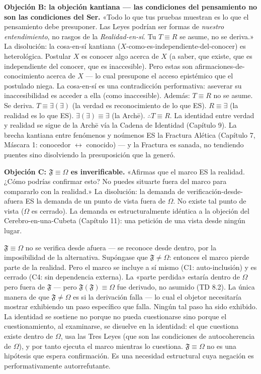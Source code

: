 \documentclass[10pt, openany, oneside]{book}
\begin{document}
\textbf{Objeción B: la objeción kantiana --- las condiciones del pensamiento no son las condiciones del Ser.} «Todo lo que tus pruebas muestran es lo que el pensamiento debe presuponer. Las Leyes podrían ser formas de \textit{nuestro entendimiento}, no rasgos de la \textit{Realidad-en-sí}. Tu $T \equiv R$ se asume, no se deriva.» La disolución: la cosa-en-sí kantiana ($X$-como-es-independiente-del-conocer) es heterológica. Postular $X$ es conocer algo acerca de $X$ (a saber, que existe, que es independiente del conocer, que es inaccesible). Pero estas son afirmaciones-de-conocimiento acerca de $X$ --- lo cual presupone el acceso epistémico que el postulado niega. La cosa-en-sí es una contradicción performativa: aseverar su inaccesibilidad es acceder a ella (como inaccesible). Además: $T \equiv R$ no se asume. Se deriva. $T \equiv \exists(\exists)$ (la verdad es reconocimiento de lo que ES). $R \equiv \exists$ (la realidad es lo que ES). $\exists(\exists) \equiv \exists$ (la Arch\={e}). $\therefore T \equiv R$. La identidad entre verdad y realidad se sigue de la Arch\={e} vía la Cadena de Identidad (Capítulo 9). La brecha kantiana entre fenómenos y noúmenos ES la Fractura Alética (Capítulo 7, Máscara 1: conocedor $\leftrightarrow$ conocido) --- y la Fractura es sanada, no tendiendo puentes sino disolviendo la presuposición que la generó.

\textbf{Objeción C: $\mathfrak{F} \equiv \Omega$ es inverificable.} «Afirmas que el marco ES la realidad. ¿Cómo podrías confirmar esto? No puedes situarte fuera del marco para compararlo con la realidad.» La disolución: la demanda de verificación-desde-afuera ES la demanda de un punto de vista fuera de $\Omega$. No existe tal punto de vista ($\Omega$ es cerrado). La demanda es estructuralmente idéntica a la objeción del Cerebro-en-una-Cubeta (Capítulo 11): una petición de una vista desde ningún lugar.

$\mathfrak{F} \equiv \Omega$ no se verifica desde afuera --- se reconoce desde dentro, por la imposibilidad de la alternativa. Supóngase que $\mathfrak{F} \neq \Omega$: entonces el marco pierde parte de la realidad. Pero el marco se incluye a sí mismo (C1: auto-inclusión) y es cerrado (C4: sin dependencia externa). La «parte perdida» estaría dentro de $\Omega$ pero fuera de $\mathfrak{F}$ --- pero $\mathfrak{F}(\mathfrak{F}) \equiv \Omega$ fue derivado, no asumido (TD 8.2). La única manera de que $\mathfrak{F} \neq \Omega$ es si la derivación falla --- lo cual el objetor necesitaría mostrar exhibiendo un paso específico que falla. Ningún tal paso ha sido exhibido. La identidad se sostiene no porque no pueda cuestionarse sino porque el cuestionamiento, al examinarse, se disuelve en la identidad: el que cuestiona existe dentro de $\Omega$, usa las Tres Leyes (que son las condiciones de autocoherencia de $\Omega$), y por tanto ejecuta el marco mientras lo cuestiona. $\mathfrak{F} \equiv \Omega$ no es una hipótesis que espera confirmación. Es una necesidad estructural cuya negación es performativamente autorrefutante.
\end{document}
